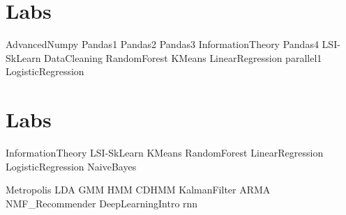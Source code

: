 \documentclass[opener-c,labs,yellow,nociteref]{HJnewsiambook}
\begin{document}
\ifbyu

\part{Labs} %
{AdvancedNumpy}
{Pandas1}
{Pandas2}
{Pandas3}
{InformationTheory}
{Pandas4}
{LSI-SkLearn}
{DataCleaning}
{RandomForest}
{KMeans}
{LinearRegression}
{parallel1}
{LogisticRegression}


\else 

\part{Labs} %
{InformationTheory}
{LSI-SkLearn}
{KMeans}
{RandomForest}
{LinearRegression}
{LogisticRegression}
{NaiveBayes}

{Metropolis}
{LDA}
{GMM}
{HMM}
{CDHMM}
{KalmanFilter}
{ARMA}
{NMF_Recommender}
{DeepLearningIntro}
{rnn}
\end{document}
